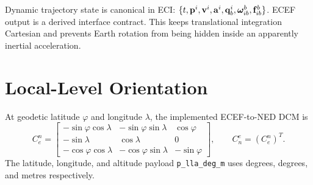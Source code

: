 \begin{implbox}
Dynamic trajectory state is canonical in ECI:
$\{t,\mathbf{p}^{i},\mathbf{v}^{i},\mathbf{a}^{i},\mathbf{q}_b^i,
\boldsymbol{\omega}_{ib}^{b},\mathbf{f}_{ib}^{b}\}$.
ECEF output is a derived interface contract. This keeps translational
integration Cartesian and prevents Earth rotation from being hidden inside an
apparently inertial acceleration.
\end{implbox}

\section{Local-Level Orientation}

At geodetic latitude $\varphi$ and longitude $\lambda$, the implemented
ECEF-to-NED DCM is
\begin{equation}
C_e^n=
\begin{bmatrix}
-\sin\varphi\cos\lambda & -\sin\varphi\sin\lambda & \cos\varphi\\
-\sin\lambda            &  \cos\lambda             & 0\\
-\cos\varphi\cos\lambda & -\cos\varphi\sin\lambda & -\sin\varphi
\end{bmatrix},
\qquad
C_n^e=\left(C_e^n\right)^{T}.
\label{eq:ecef_ned_dcm}
\end{equation}
The latitude, longitude, and altitude payload
\texttt{p\_lla\_deg\_m} uses degrees, degrees, and metres respectively.
